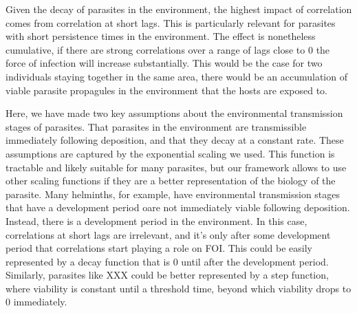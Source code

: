 \documentclass[letterpaper]{article}
\begin{document}
Given the decay of parasites in the environment, the highest impact of correlation comes from correlation at short lags. %
This is particularly relevant for parasites with short persistence times in the environment. %
The effect is nonetheless cumulative, if there are strong correlations over a range of lags close to 0 the force of infection will increase substantially. This would be the case for two individuals staying together in the same area, there would be an accumulation of viable parasite propagules in the environment that the hosts are exposed to. 

Here, we have made two key assumptions about the environmental transmission stages of parasites. That parasites in the environment are transmissible immediately following deposition, and that they decay at a constant rate. 
These assumptions are captured by the exponential scaling we used. This function is tractable and likely suitable for many parasites, but our framework allows to use other scaling functions if they are a better representation of the biology of the parasite. 
Many helminths, for example, have environmental transmission stages that have a development period oare not immediately viable following deposition. Instead, there is a development period in the environment. In this case, correlations at short lags are irrelevant, and it's only after some development period that correlations start playing a role on FOI. This could be easily represented by a decay function that is 0 until after the development period. Similarly, parasites like XXX could be better represented by a step function, where viability is constant until a threshold time, beyond which viability drops to 0 immediately. 

\end{document}
